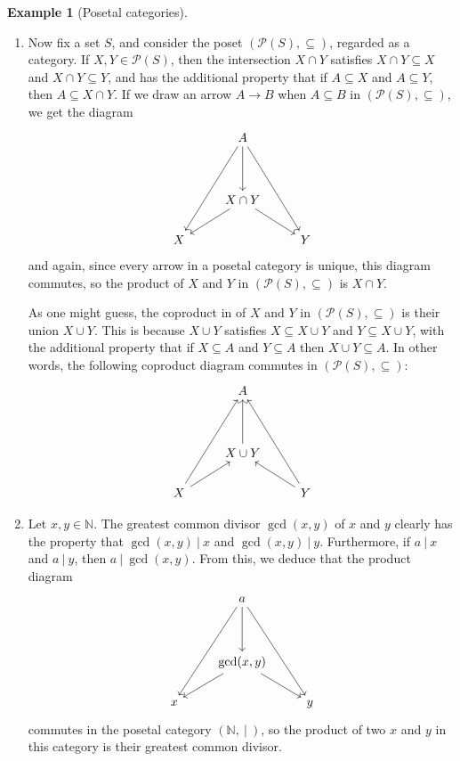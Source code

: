 \documentclass[10pt,oneside]{book}
\def\~#1{\mathscr{#1}}
\newcommand{\N}{\mathbb{N}}
\theoremstyle{plain}
\theoremstyle{definition}
\newtheorem{ex}[thm]{Example}
\theoremstyle{remark}
\numberwithin{equation}{section}
\numberwithin{figure}{section}
\begin{document}
\begin{ex}[Posetal categories]
\begin{enumerate}[label=(\roman*)]
\item Now fix a set $S$, and consider the poset $(\~P(S), \subseteq)$, regarded as a 
category. If $X, Y \in \~P(S)$, then the intersection $X \cap Y$ satisfies $X \cap Y \subseteq X$ and $X \cap Y \subseteq Y$, and has the additional property that if $A \subseteq X$ and $A \subseteq Y$, then $A \subseteq X \cap Y$. If we draw an arrow $A \to B$ when $A \subseteq B$ in $(\~P(S), \subseteq)$, we get the diagram 
\[
  \begin{tikzcd}
    & A \\
    \\
    & {X \cap Y} \\
    X && Y
    \arrow[from=1-2, to=4-1]
    \arrow[from=3-2, to=4-1]
    \arrow[from=1-2, to=4-3]
    \arrow[from=3-2, to=4-3]
    \arrow[from=1-2, to=3-2]
\end{tikzcd}
\]
and again, since every arrow in a posetal category is unique, this diagram commutes, so the product of $X$ and $Y$ in $(\~P(S), \subseteq)$ is $X \cap Y$. 

As one might guess, the coproduct in of $X$ and $Y$ in $(\~P(S), \subseteq)$ is their union $X \cup Y$. This is because $X \cup Y$ satisfies $X \subseteq X \cup Y$ and $Y \subseteq X \cup Y$, with the additional property that if $X \subseteq A$ and $Y \subseteq A$ then $X \cup Y \subseteq A$. In other words, the following coproduct diagram commutes in $(\~P(S), \subseteq)$:
\[\begin{tikzcd}
    & A \\
    \\
    & {X \cup Y} \\
    X && Y
    \arrow[from=4-1, to=3-2]
    \arrow[from=4-3, to=3-2]
    \arrow[from=3-2, to=1-2]
    \arrow[from=4-1, to=1-2]
    \arrow[from=4-3, to=1-2]
\end{tikzcd}\]

\item Let $x, y \in \N$. The greatest common divisor $\gcd(x, y)$ of $x$ and $y$ clearly has the property that $\gcd(x, y) ~|~ x$ and $\gcd(x, y) ~|~ y$. Furthermore, if $a~|~x$ and $a~|~y$, then $a ~|~\gcd(x, y)$. From this, we deduce that the product diagram
\[
  \begin{tikzcd}
    & a \\
    \\
    & {\gcd(x, y)} \\
    x && y
    \arrow[from=1-2, to=4-1]
    \arrow[from=3-2, to=4-1]
    \arrow[from=1-2, to=4-3]
    \arrow[from=3-2, to=4-3]
    \arrow[from=1-2, to=3-2]
\end{tikzcd}
\]
commutes in the posetal category $(\N, ~|~)$, so the product of two $x$ and $y$ in this category is their greatest common divisor.  


\end{enumerate}
\end{ex}
\end{document}
